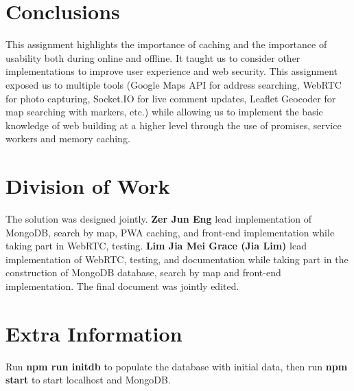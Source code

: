 \documentclass[11pt, a4paper]{article}
\begin{document}
\section{Conclusions}
This assignment highlights the importance of caching and the importance of usability both during
online and offline. It taught us to consider other implementations to improve user experience and
web security. This assignment exposed us to multiple tools (Google Maps API for address searching,
WebRTC for photo capturing, Socket.IO for live comment updates, Leaflet Geocoder for map searching
with markers, etc.) while allowing us to implement the basic knowledge of web building at a higher
level through the use of promises, service workers and memory caching.

\section{Division of Work}
The solution was designed jointly. \textbf{Zer Jun Eng} lead implementation of MongoDB, search
by map, PWA caching, and front-end implementation while taking part in WebRTC, testing.
\textbf{Lim Jia Mei Grace (Jia Lim)} lead implementation of WebRTC, testing, and documentation
while taking part in the construction of MongoDB database, search by map and front-end
implementation. The final document was jointly edited. 

\section{Extra Information}
Run \textbf{npm run initdb} to populate the database with initial data, then run \textbf{npm start}
to start localhost and MongoDB.

\printbibliography

\appendix
\end{document}
